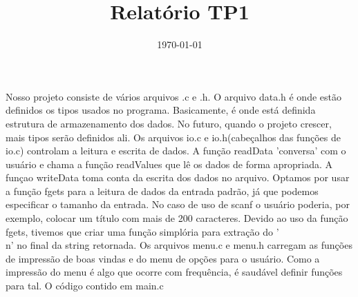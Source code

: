 \documentclass{article}
\title{Relatório TP1}
\date{\today}
\begin{document}
Nosso projeto consiste de vários arquivos .c e .h.
O arquivo data.h é onde estão definidos os tipos usados no programa. Basicamente, é onde está definida estrutura de armazenamento dos dados. No futuro, quando o projeto crescer, mais tipos serão definidos ali.
Os arquivos io.c e io.h(cabeçalhos das funções de io.c) controlam a leitura e escrita de dados. A função readData 'conversa' com o usuário e chama a função readValues que lê os dados de forma apropriada. A funçao writeData toma conta da escrita dos dados no arquivo.
Optamos por usar a função fgets para a leitura de dados da entrada padrão, já que podemos especificar o tamanho da entrada. No caso de uso de scanf o usuário poderia, por exemplo, colocar um título com mais de 200 caracteres. Devido ao uso da função fgets, tivemos que criar uma função simplória para extração do '\\n' no final da string retornada.
Os arquivos menu.c e menu.h carregam as funções de impressão de boas vindas e do menu de opções para o usuário. Como a impressão do menu é algo que ocorre com frequência, é saudável definir funções para tal.
O código contido em main.c 
\end{document}
